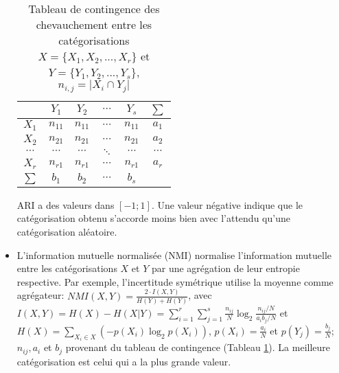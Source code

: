 \begin{itemize}
	\begin{table}[!htb]
		\centering \small
		\begin{tabular}{|c|c|c|c|c|c|}
			\hline
			& $Y_1$    & $Y_2$    & $\cdots$ & $Y_s$    & $\sum$   \\ \hline
			$X_1$    & $n_{11}$ & $n_{11}$ & $\cdots$ & $n_{11}$ & $a_1$    \\ \hline
			$X_2$    & $n_{21}$ & $n_{21}$ & $\cdots$ & $n_{21}$ & $a_2$    \\ \hline
			$\cdots$ & $\cdots$ & $\cdots$ & $\ddots$ & $\cdots$ & $\cdots$ \\ \hline
			$X_r$    & $n_{r1}$ & $n_{r1}$ & $\cdots$ & $n_{r1}$ & $a_r$    \\ \hline
			$\sum$   & $b_1$    & $b_2$    & $\cdots$ & $b_s$    &          \\ \hline
		\end{tabular}
		\caption{Tableau de contingence des chevauchement entre les catégorisations $X = \lbrace X_1, X_2, ..., X_r \rbrace$ et $Y = \lbrace Y_1, Y_2, ..., Y_s \rbrace$, $n_{i,j} = \vert X_i \cap Y_j\vert$} \label{tab:similarite:tab-contingence}
	\end{table}
ARI a des valeurs dans $[-1;1]$. Une valeur négative indique que le catégorisation obtenu s'accorde moins bien avec l'attendu qu'une catégorisation aléatoire. 
	\item L'information mutuelle normalisée (NMI) \citep{kvalseth1987entropy_NMI,strehl2000nmi, vinh2010clusteringComparison} normalise l'information mutuelle entre les catégorisations $X$ et $Y$ par une agrégation de leur entropie respective. Par exemple, l'incertitude symétrique \citep{kvalseth1987entropy_NMI} utilise la moyenne comme agrégateur:  $NMI(X,Y) = \frac{2 \cdot I(X,Y)}{H(Y) + H(Y)} $, 
	avec $I(X,Y) = H(X) - H(X \vert Y) = \sum\limits_{i=1}^{r}\sum\limits_{j=1}^{s} \frac{n_{ij}}{N} \log_2\frac{{n_{ij}}/{N}}{{a_ib_j}/{N}}$ et $H(X) = \sum\limits_{X_i \in X}\left(- p(X_i)\log_2 p(X_i)\right)$,  $p(X_i) = \frac{a_i}{N}$ et $p(Y_j) = \frac{b_j}{N}$; $n_{ij}, a_i$ et $b_j$ provenant du tableau de contingence (Tableau \ref{tab:similarite:tab-contingence}). La meilleure catégorisation est celui qui a la plus grande valeur.
	

\end{itemize}
